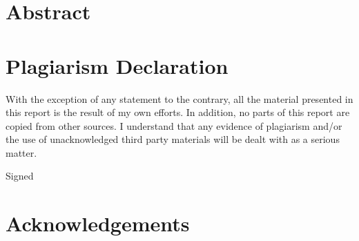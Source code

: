 \documentclass[11pt]{report}
\begin{document}
\maketitle

\chapter*{Abstract}
\blindtext[1] %

\chapter*{Plagiarism Declaration}
With the exception of any statement to the contrary, all the material presented in this report is the result of my own efforts. In addition, no parts of this report are copied from other sources. I understand that any evidence of plagiarism and/or the use of unacknowledged third party materials will be dealt with as a serious matter.

\vspace{2cm}
Signed 

\chapter*{Acknowledgements}
\blindtext[1]

\tableofcontents
\listoffigures
\listoftables

\newpage
\setcounter{page}{0}

 
 

\renewcommand\bibname{References}
\printbibliography


\end{document}
